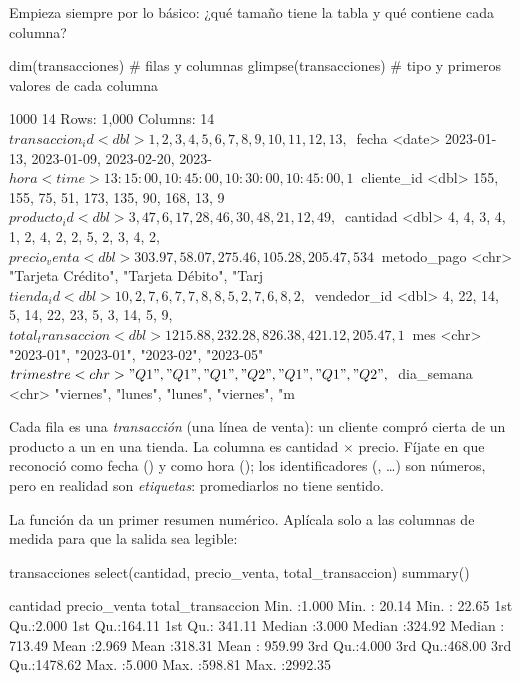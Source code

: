 Empieza siempre por lo básico: ¿qué tamaño tiene la tabla y qué contiene cada
columna?

\begin{rcode}
dim(transacciones)        # filas y columnas
glimpse(transacciones)    # tipo y primeros valores de cada columna
\end{rcode}
\begin{rsalida}
[1] 1000   14
Rows: 1,000
Columns: 14
$ transaccion_id    <dbl> 1, 2, 3, 4, 5, 6, 7, 8, 9, 10, 11, 12, 13,~
$ fecha             <date> 2023-01-13, 2023-01-09, 2023-02-20, 2023-~
$ hora              <time> 13:15:00, 10:45:00, 10:30:00, 10:45:00, 1~
$ cliente_id        <dbl> 155, 155, 75, 51, 173, 135, 90, 168, 13, 9~
$ producto_id       <dbl> 3, 47, 6, 17, 28, 46, 30, 48, 21, 12, 49, ~
$ cantidad          <dbl> 4, 4, 3, 4, 1, 2, 4, 2, 2, 5, 2, 3, 4, 2, ~
$ precio_venta      <dbl> 303.97, 58.07, 275.46, 105.28, 205.47, 534~
$ metodo_pago       <chr> "Tarjeta Crédito", "Tarjeta Débito", "Tarj~
$ tienda_id         <dbl> 10, 2, 7, 6, 7, 7, 8, 8, 5, 2, 7, 6, 8, 2,~
$ vendedor_id       <dbl> 4, 22, 14, 5, 14, 22, 23, 5, 3, 14, 5, 9, ~
$ total_transaccion <dbl> 1215.88, 232.28, 826.38, 421.12, 205.47, 1~
$ mes               <chr> "2023-01", "2023-01", "2023-02", "2023-05"~
$ trimestre         <chr> "Q1", "Q1", "Q1", "Q2", "Q1", "Q1", "Q2", ~
$ dia_semana        <chr> "viernes", "lunes", "lunes", "viernes", "m~
\end{rsalida}

Cada fila es una \emph{transacción} (una línea de venta): un cliente compró
cierta  de un producto a un  en una
tienda. La columna  es cantidad $\times$ precio.
Fíjate en que  reconoció  como fecha
() y  como hora (); los
identificadores (, \ldots) son
números, pero en realidad son \emph{etiquetas}: promediarlos no tiene
sentido.

La función  da un primer resumen numérico. Aplícala solo a
las columnas de medida para que la salida sea legible:

\begin{rcode}
transacciones %
  select(cantidad, precio_venta, total_transaccion) %
  summary()
\end{rcode}
\begin{rsalida}
    cantidad      precio_venta    total_transaccion
 Min.   :1.000   Min.   : 20.14   Min.   :  22.65
 1st Qu.:2.000   1st Qu.:164.11   1st Qu.: 341.11
 Median :3.000   Median :324.92   Median : 713.49
 Mean   :2.969   Mean   :318.31   Mean   : 959.99
 3rd Qu.:4.000   3rd Qu.:468.00   3rd Qu.:1478.62
 Max.   :5.000   Max.   :598.81   Max.   :2992.35
\end{rsalida}

